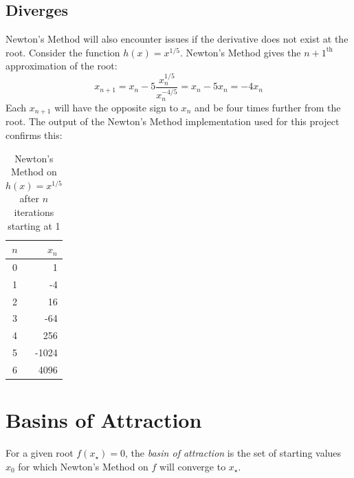 \documentclass[10pt,a4paper]{article}
\begin{document}
		\subsection{Diverges}
		Newton's Method will also encounter issues if the derivative does not exist at the root. Consider the function $h(x) = x^{1/5}$. Newton's Method gives the $ n+1^\text{th} $ approximation of the root:
		$$ x_{n+1} = x_n - 5\frac{x_n^{1/5}}{x_n^{-4/5}} = x_n - 5x_n = -4x_n$$
		Each $x_{n+1}$ will have the opposite sign to $x_n$ and be four times further from the root. The output of the Newton's Method implementation used for this project confirms this:
		\begin{table}[H]
			\centering
			\caption{Newton's Method on $h(x) = x^{1/5}$ after $n$ iterations starting at 1}
			\begin{tabular}{c | r}
				\hline
				$n$ & $x_n$\\
				\hline\hline
				0 & 1\\
				1 & -4\\
				2 & 16\\
				3 & -64\\
				4 & 256\\
				5 & -1024\\
				6 & 4096\\
			\end{tabular}
		\end{table}
	\section{Basins of Attraction}
	For a given root $ f(x_\star) = 0$, the \emph{basin of attraction} is the set of starting values $ x_0 $ for which Newton's Method on $f$ will converge to $ x_\star $.
	
\end{document}
